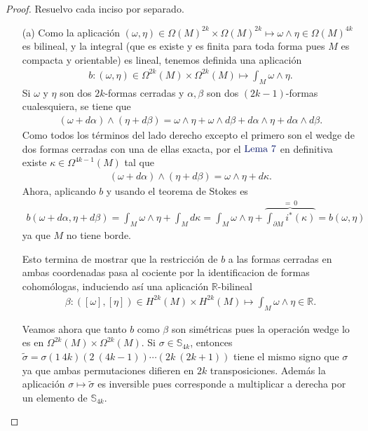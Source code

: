 \documentclass[11pt]{article}
\newcommand{\R}{\mathbb{R}}
\newcommand{\Ss}{\mathbb{S}}
\newcommand{\paint}[1]{\color{color}{#1}}
\newcommand{\tpaing}[1]{\paint{\text{#1}}}
\begin{document}
\begin{proof} Resuelvo cada inciso por separado.
\begin{itemize}[listparindent = \parindent]
\item[(a)] Como la aplicación $(\omega,\eta) \in \Omega(M)^{2k} \times \Omega(M)^{2k} \mapsto \omega \wedge \eta \in \Omega(M)^{4k}$ es bilineal, y la integral (que es existe y es finita para toda forma pues $M$ es compacta y orientable) es lineal, tenemos definida una aplicación
\begin{align*}
b : (\omega,\eta) \in \Omega^{2k}(M) \times \Omega^{2k}(M) \mapsto \int_M \omega \wedge \eta.
\end{align*}
Si $\omega$ y $\eta$ son dos $2k$-formas cerradas y $\alpha, \beta$ son dos $(2k-1)$-formas cualesquiera, se tiene que
\begin{align*}
(\omega+d\alpha) \wedge (\eta + d\beta) = \omega \wedge \eta + \omega \wedge d\beta + d\alpha \wedge \eta + d\alpha \wedge d\beta.
\end{align*}
Como todos los términos del lado derecho excepto el primero son el wedge de dos formas cerradas con una de ellas exacta, por el $\tpaing{Lema $7$}$ en definitiva existe $\kappa \in \Omega^{4k-1}(M)$ tal que 
\begin{align*}
(\omega+d\alpha) \wedge (\eta + d\beta) = \omega \wedge \eta + d\kappa.
\end{align*}
Ahora, aplicando $b$ y usando el teorema de Stokes es
\begin{align*}
b(\omega+d\alpha,\eta+d\beta) = \int_M \omega \wedge \eta + \int_M d\kappa = \int_M \omega \wedge \eta + \overbrace{\int_{\partial M}i^*(\kappa)}^{= \ 0} = b(\omega,\eta)
\end{align*}
ya que $M$ no tiene borde.

Esto termina de mostrar que la restricción de $b$ a las formas cerradas en ambas coordenadas pasa al cociente por la identificacion de formas cohomólogas, induciendo así una aplicación $\R$-bilineal
\begin{align*}
\beta : ([\omega],[\eta]) \in H^{2k}(M) \times H^{2k}(M) \mapsto \int_M \omega \wedge \eta \in \R.
\end{align*}

Veamos ahora que tanto $b$ como $\beta$ son simétricas pues la operación wedge lo es en $\Omega^{2k}(M) \times \Omega^{2k}(M)$. Si $\sigma \in \Ss_{4k}$, entonces $\widetilde{\sigma} = \sigma (1 \ 4k)(2 \ (4k-1)) \cdots (2k \ (2k+1))$ tiene el mismo signo que $\sigma$ ya que ambas permutaciones difieren en $2k$ transposiciones. Además la aplicación $\sigma \mapsto \widetilde{\sigma}$ es inversible pues corresponde a multiplicar a derecha por un elemento de $\Ss_{4k}$.


\end{itemize}
\end{proof}
\end{document}
